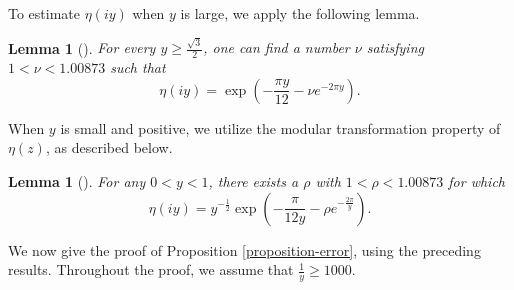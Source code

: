 \documentclass[11pt]{amsart}
\theoremstyle{plain}
\newtheorem{lemma}[theorem]{Lemma}
\numberwithin{equation}{section}
\begin{document}
	To estimate $\eta(iy)$ when $y$ is large, we apply the following lemma.
	\begin{lemma}[{\cite[Lemma 2.3]{barman2025lower}}]\label{lemma-2.1}
		For every $y\ge\frac{\sqrt{3}}{2}$, one can find a number $\nu$ satisfying $1<\nu<1.00873$ such that
		\begin{equation*}
			\eta(iy) = \exp\left(-\frac{\pi y}{12} - \nu e^{-2\pi y}\right).
		\end{equation*}
	\end{lemma}
	When $y$ is small and positive, we utilize the modular transformation property of $\eta(z)$, as described below.
	\begin{lemma}[{\cite[Lemma 2.4]{barman2025lower}}]\label{lemma-2.2}
		For any $0<y<1$, there exists a $\rho$ with $1<\rho<1.00873$ for which
		\begin{equation*}
			\eta(iy) = y^{-\frac{1}{2}} \exp\left( -\frac{\pi}{12y} - \rho e^{-\frac{2\pi}{y}} \right).
		\end{equation*}
	\end{lemma}
	We now give the proof of Proposition \ref{proposition-error}, using the preceding results. Throughout the proof, we assume that $\frac{1}{y}\ge 1000$.
	
\end{document}
